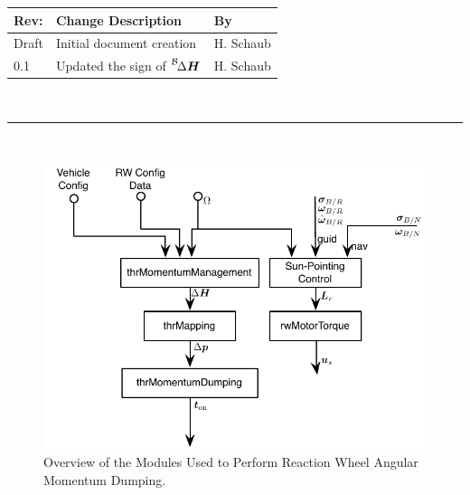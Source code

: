 \documentclass[]{BasiliskReportMemo}
\begin{document}
\makeCover


%
%
\pagestyle{empty}
{\renewcommand{\arraystretch}{1.1}
\noindent
\begin{longtable}{|p{0.5in}|p{4.5in}|p{1.14in}|}
\hline
{\bfseries Rev}: & {\bfseries Change Description} & {\bfseries By} \\
\hline
Draft & Initial document creation & H. Schaub \\
0.1 & Updated the sign of $\leftexp{B}{\Delta\bm H}$ & H. Schaub \\
\hline

\end{longtable}
}

\newpage
\setcounter{page}{1}
\pagestyle{fancy}

\tableofcontents
~\\ \hrule ~\\

\begin{figure}[htb]
	\centerline{
	\includegraphics[]{Figures/rwMomentumOverview}
	}
	\caption{Overview of the Modules Used to Perform Reaction Wheel Angular Momentum Dumping.}
	\label{fig:Fig1}
\end{figure}
\end{document}
